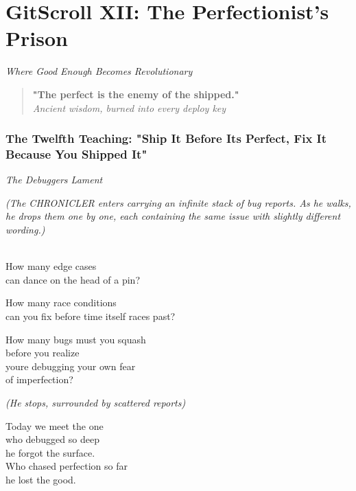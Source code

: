 \chapter{GitScroll XII: The Perfectionist's Prison}
\label{chap:15-The-Perfectionists-Prison}

\emph{Where \textquotesingle Good Enough\textquotesingle{} Becomes Revolutionary}

\begin{quote}
\textbf{"The perfect is the enemy of the shipped."}\\
\emph{Ancient wisdom, burned into every deploy key}
\end{quote}

\subsection{The Twelfth Teaching: "Ship It Before It\textquotesingle s Perfect, Fix It Because You Shipped It"}\label{the-twelfth-teaching-ship-it-before-its-perfect-fix-it-because-you-shipped-it}

\label{performing_arts-invocation-before-the-scroll}

\emph{The Debugger\textquotesingle s Lament}

\emph{(The CHRONICLER enters carrying an infinite stack of bug reports. As he walks, he drops them one by one, each containing the same issue with slightly different wording.)}

\\
How many edge cases\\
can dance on the head of a pin?

How many race conditions\\
can you fix before time itself races past?

How many bugs must you squash\\
before you realize\\
you\textquotesingle re debugging your own fear\\
of imperfection?

\emph{(He stops, surrounded by scattered reports)}

Today we meet the one\\
who debugged so deep\\
he forgot the surface.\\
Who chased perfection so far\\
he lost the good.


